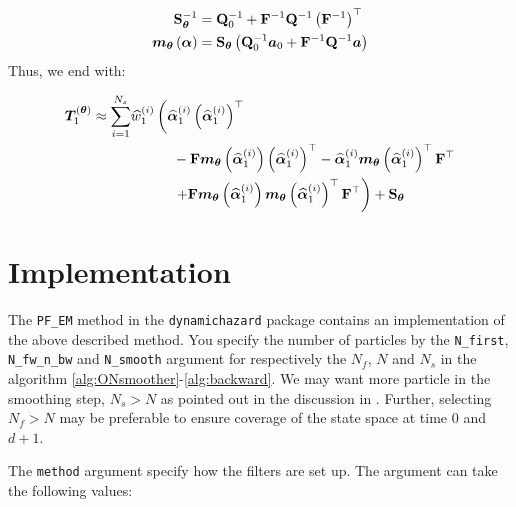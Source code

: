 \begin{equation}\begin{split}
	\mat{S}_{\vec{\theta}}^{-1} &= 
		\mat{Q}_0^{-1} + \mat{F}^{-1}\mat{Q}^{-1}\Lparen{\mat{F}^{-1}}^\top \\ 
%
	\optor{\vec{m}_{\vec{\theta}}}{\vec{\alpha}} &= 
		\mat{S}_{\vec{\theta}}
		\Lparen{\mat{Q}_0^{-1}\vec{a}_0 + \mat{F}^{-1}\mat{Q}^{-1}\vec{a}}
\end{split}\end{equation}%
%
Thus, we end with:

\begin{equation}\begin{split}
\vec{T}_1^{(\vec{\theta})} \approx  
	\sum_{i = 1}^{N_s} \hspace{30pt} & \hspace{-30pt} \particS{w}{1}{i}\left(
		\particS{\vec{\alpha}}{1}{i}\Lparen{\particS{\vec{\alpha}}{1}{i}}^\top \right. \\
%
	&  -\mat{F}\optor{\vec{m}_{\vec{\theta}}}{\particS{\vec{\alpha}}{1}{i}}
		\Lparen{\particS{\vec{\alpha}}{1}{i}}^\top
	- \particS{\vec{\alpha}}{1}{i}
		\optor{\vec{m}_{\vec{\theta}}}{\particS{\vec{\alpha}}{1}{i}}^\top\mat{F}^\top \\
%
	& \left. + \mat{F}
		\optor{\vec{m}_{\vec{\theta}}}{\particS{\vec{\alpha}}{1}{i}}
		\optor{\vec{m}_{\vec{\theta}}}{\particS{\vec{\alpha}}{1}{i}}^\top
	\mat{F}^\top \right) + \mat{S}_{\vec{\theta}} 
\end{split}\end{equation}

\section{Implementation}
The \verb|PF_EM| method in the \verb|dynamichazard| package contains an implementation of the above described method. You specify the number of particles by the \verb|N_first|, \verb|N_fw_n_bw| and \verb|N_smooth| argument for respectively the $N_f$, $N$ and $N_s$ in the algorithm \ref{alg:ONsmoother}-\ref{alg:backward}. We may want more particle in the smoothing step, $N_s > N$ as pointed out in the discussion in \citet[page 460 and 461]{fearnhead10}. Further, selecting $N_f > N$ may be preferable to ensure coverage of the state space at time $0$ and $d + 1$.

The \verb|method| argument specify how the filters are set up. The argument can take the following values:

